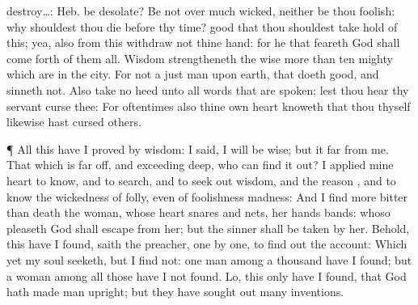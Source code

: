 {{destroy…: Heb. be desolate?}
Be not over
much
wicked, neither be thou
foolish: why shouldest thou
die before thy
time?
good that thou shouldest take
hold of this; yea, also from
this
withdraw not thine
hand: for he that
feareth
God shall come
forth of them all.
Wisdom
strengtheneth the
wise more than
ten
mighty
{} which are in the
city.
For
{} not a
just
man upon
earth, that
doeth
good, and
sinneth not.
Also
take no
heed unto all
words that are
spoken; lest thou
hear thy
servant
curse thee:
For
oftentimes also thine own
heart
knoweth that thou thyself likewise hast
cursed
others.
\par }{\PP {}¶ All
this have I
proved by
wisdom: I
said, I will be
wise; but it
{}
far from me.
That which is far
off, and exceeding
deep, who can find it
out?
I
applied mine
heart to
know, and to
search, and to seek
out
wisdom, and the
reason
{}, and to
know the
wickedness of
folly, even of
foolishness
{}
madness:
And I
find more
bitter than
death the
woman, whose
heart
{}
snares and
nets,
{} her
hands
{}
bands: whoso
pleaseth
God shall
escape from her; but the
sinner shall be
taken by her.
Behold, this have I
found,
saith the
preacher,
{}
one by
one, to find
out the
account:
Which yet my
soul
seeketh, but I
find not:
one
man among a
thousand have I
found; but a
woman among all those have I not
found.
Lo, this
only have I
found, that
God hath
made
man
upright; but they have sought
out
many
inventions.

}
